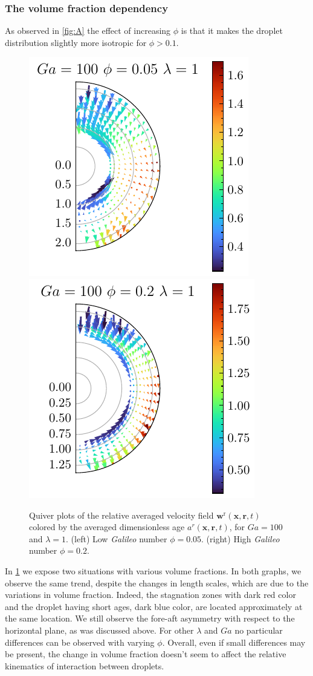 \subsubsection{The volume fraction dependency}
As observed in \ref{fig:A} the effect of increasing $\phi$ is that it makes the droplet distribution slightly more isotropic for $\phi >0.1$. 
\begin{figure}[h!]
    \centering
    \includegraphics[height=0.35\textwidth]{image/HOMOGENEOUS_NEW/Dist/U_rel_l_1_Ga_100_PHI_5.pdf}
    \includegraphics[height=0.35\textwidth]{image/HOMOGENEOUS_NEW/Dist/U_rel_l_1_Ga_100_PHI_20.pdf}
    \caption{Quiver plots of the relative averaged velocity field $\textbf{w}^\text{r}(\textbf{x},\textbf{r},t)$ colored by the averaged dimensionless age $a^r(\textbf{x},\textbf{r},t)$, for $Ga = 100$ and $\lambda = 1$. 
    (left) Low \textit{Galileo} number $\phi = 0.05$.
    (right) High \textit{Galileo} number $\phi = 0.2$. }
    \label{fig:Why_Phi_matter}
\end{figure}
In \ref{fig:Why_Phi_matter} we expose two situations with various volume fractions. 
In both graphs, we observe the same trend, despite the changes in length scales, which are due to the variations in volume fraction. 
Indeed, the stagnation zones with dark red color and the droplet having short ages, dark blue color, are located approximately at the same location. 
We still observe the fore-aft asymmetry with respect to the horizontal plane, as was discussed above. 
For other $\lambda$ and $Ga$ no particular differences can be observed with varying $\phi$. 
Overall, even if small differences may be present, the change in volume fraction doesn't seem to affect the relative kinematics   of interaction between droplets. 

